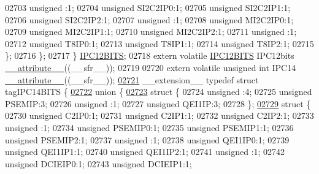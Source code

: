\begin{DoxyCode}
02703       \textcolor{keywordtype}{unsigned} :1;
02704       \textcolor{keywordtype}{unsigned} SI2C2IP0:1;
02705       \textcolor{keywordtype}{unsigned} SI2C2IP1:1;
02706       \textcolor{keywordtype}{unsigned} SI2C2IP2:1;
02707       \textcolor{keywordtype}{unsigned} :1;
02708       \textcolor{keywordtype}{unsigned} MI2C2IP0:1;
02709       \textcolor{keywordtype}{unsigned} MI2C2IP1:1;
02710       \textcolor{keywordtype}{unsigned} MI2C2IP2:1;
02711       \textcolor{keywordtype}{unsigned} :1;
02712       \textcolor{keywordtype}{unsigned} T8IP0:1;
02713       \textcolor{keywordtype}{unsigned} T8IP1:1;
02714       \textcolor{keywordtype}{unsigned} T8IP2:1;
02715     \};
02716   \};
02717 \} \hyperlink{a00014_d8/d14/a00522}{IPC12BITS};
02718 \textcolor{keyword}{extern} \textcolor{keyword}{volatile} \hyperlink{a00014_d8/d14/a00522}{IPC12BITS} IPC12bits \hyperlink{a00015_a493c46f03454991ccc5aa7a6e1dfb2a7}{\_\_attribute\_\_}((\_\_sfr\_\_));
02719 
02720 \textcolor{keyword}{extern} \textcolor{keyword}{volatile} \textcolor{keywordtype}{unsigned} \textcolor{keywordtype}{int}  IPC14 \hyperlink{a00015_a493c46f03454991ccc5aa7a6e1dfb2a7}{\_\_attribute\_\_}((\_\_sfr\_\_));
\hypertarget{a00015_source_l02721}{}\hyperlink{a00014}{02721} \_\_extension\_\_ \textcolor{keyword}{typedef} \textcolor{keyword}{struct }tagIPC14BITS \{
\hypertarget{a00015_source_l02722}{}\hyperlink{a00015}{02722}   \textcolor{keyword}{union }\{
\hypertarget{a00015_source_l02723}{}\hyperlink{a00015}{02723}     \textcolor{keyword}{struct }\{
02724       \textcolor{keywordtype}{unsigned} :4;
02725       \textcolor{keywordtype}{unsigned} PSEMIP:3;
02726       \textcolor{keywordtype}{unsigned} :1;
02727       \textcolor{keywordtype}{unsigned} QEI1IP:3;
02728     \};
\hypertarget{a00015_source_l02729}{}\hyperlink{a00015}{02729}     \textcolor{keyword}{struct }\{
02730       \textcolor{keywordtype}{unsigned} C2IP0:1;
02731       \textcolor{keywordtype}{unsigned} C2IP1:1;
02732       \textcolor{keywordtype}{unsigned} C2IP2:1;
02733       \textcolor{keywordtype}{unsigned} :1;
02734       \textcolor{keywordtype}{unsigned} PSEMIP0:1;
02735       \textcolor{keywordtype}{unsigned} PSEMIP1:1;
02736       \textcolor{keywordtype}{unsigned} PSEMIP2:1;
02737       \textcolor{keywordtype}{unsigned} :1;
02738       \textcolor{keywordtype}{unsigned} QEI1IP0:1;
02739       \textcolor{keywordtype}{unsigned} QEI1IP1:1;
02740       \textcolor{keywordtype}{unsigned} QEI1IP2:1;
02741       \textcolor{keywordtype}{unsigned} :1;
02742       \textcolor{keywordtype}{unsigned} DCIEIP0:1;
02743       \textcolor{keywordtype}{unsigned} DCIEIP1:1;

\end{DoxyCode}
